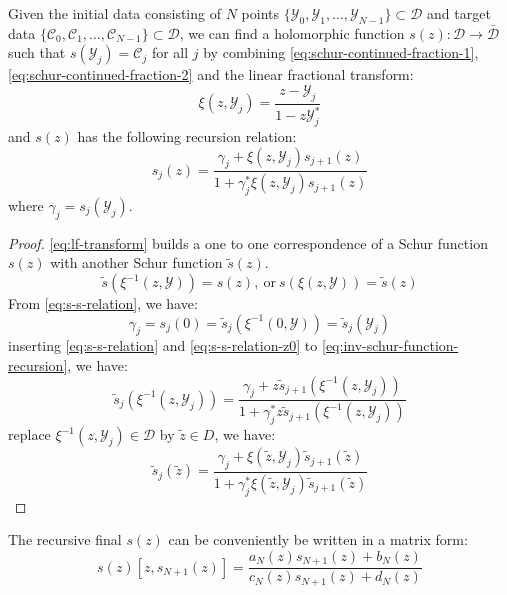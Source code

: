 \documentclass[
	preprint,%
	aps,
	prb,
	showpacs,	
	amsmath, amssymb]{revtex4-2}
\newcommand{\Y}{ {\mathcal{Y}} }
\newcommand{\C}{ {\mathcal{C}} }
\newcommand{\D}{ {\mathcal{D}} }
\newcommand{\Dbar}{ {\bar{\mathcal{D}}} }
\begin{document}
Given the initial data consisting of $N$ points 
$\{\Y_0, \Y_1, \dots ,\Y_{N-1}\} \subset \D$ and target data
$\{\C_0, \C_1, \dots ,\C_{N-1}\} \subset \D$, 
we can find a holomorphic function $s(z): \D \to \Dbar$ 
such that $s(\Y_j) = \C_j$ for all $j$ by combining 
\cref{eq:schur-continued-fraction-1}, \cref{eq:schur-continued-fraction-2} 
and the linear fractional transform:
\begin{equation}\label{eq:lf-transform}
	\xi(z, \Y_j) = \frac{z - \Y_j}{1 - z\Y_j^*}
\end{equation}
and $s(z)$ has the following recursion relation:
\begin{equation}\label{eq:inv-schur-function-recursion-another-s}
	s_j(z) 
	= \frac{\gamma_j + \xi(z, \Y_j) s_{j+1}(z) }
		{1 + \gamma_j^* \xi(z, \Y_j) s_{j+1}(z)}
\end{equation}
where $\gamma_j = s_j(\Y_j)$.
\begin{proof}
	\cref{eq:lf-transform} builds a one to one correspondence of 
	a Schur function $s(z)$ with another Schur function $\tilde{s}(z)$.
	\begin{equation}\label{eq:s-s-relation}
		\tilde{s}(\xi^{-1}(z, \Y)) = s(z), \ 
		\mathrm{or} \ s(\xi(z, \Y)) = \tilde{s}(z)
	\end{equation}
	From \cref{eq:s-s-relation}, we have:
	\begin{equation}\label{eq:s-s-relation-z0}
		\gamma_j = s_j(0) = \tilde{s}_j(\xi^{-1}(0, \Y)) 
			= \tilde{s}_j(\Y_j)
	\end{equation}
	inserting \cref{eq:s-s-relation} and \cref{eq:s-s-relation-z0}
	to \cref{eq:inv-schur-function-recursion}, we have: 
	\begin{equation}
		\tilde{s}_j(\xi^{-1}(z, \Y_j)) 
		= \frac{\gamma_j + z \tilde{s}_{j+1}(\xi^{-1}(z, \Y_j)) }
			{1 + \gamma_j^* z \tilde{s}_{j+1}(\xi^{-1}(z, \Y_j))}
	\end{equation}
	replace $\xi^{-1}(z, \Y_j) \in \D$ by $\tilde{z} \in D$, we have:
	\begin{equation}
		\tilde{s}_j(\tilde{z}) 
		= \frac{\gamma_j + \xi(\tilde{z}, \Y_j) \tilde{s}_{j+1}(\tilde{z}) }
			{1 + \gamma_j^* \xi(\tilde{z}, \Y_j) \tilde{s}_{j+1}(\tilde{z})}
	\end{equation}
\end{proof}
The recursive final $s(z)$ can be conveniently be written in a matrix
form:
\begin{equation}\label{eq:recursive-s}
	s(z)[z, s_{N+1}(z)] 
	= \frac{a_N(z) s_{N+1}(z) + b_N(z)}{c_N(z) s_{N+1}(z) + d_N(z)}
\end{equation}
\end{document}
